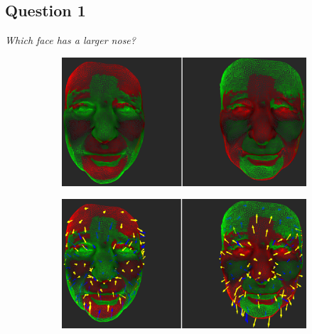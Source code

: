 \subsection{Question 1}
\label{attch:complete_study_results-question1}

\begin{center}{\it Which face has a larger nose?}\end{center}

\begin{figure}[h]
\centering
\begin{subfigure}{0.49\textwidth}
\includegraphics[width=\textwidth]{./img-study/pair2.PNG}
\caption{}
\label{fig:study-0-2}
\end{subfigure}
\begin{subfigure}{0.49\textwidth}
\includegraphics[width=\textwidth]{./img-study/pair4.PNG}
\caption{}
\label{fig:study-0-4}
\end{subfigure}


\end{figure}
